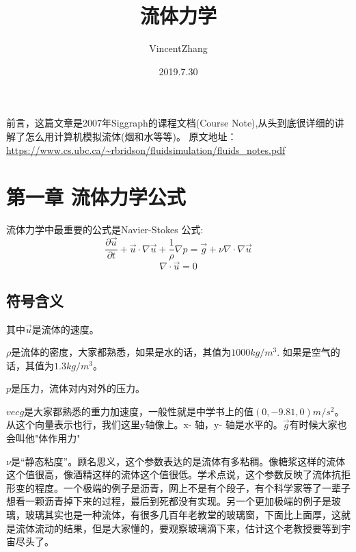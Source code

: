 \documentclass{article}
\author{VincentZhang}  %
\date{2019.7.30}  %
\title{流体力学}  %
\begin{document}
\maketitle
前言，这篇文章是2007年Siggraph的课程文档(Course Note),从头到底很详细的讲解了怎么用计算机模拟流体(烟和水等等)。
原文地址： \url{https://www.cs.ubc.ca/~rbridson/fluidsimulation/fluids_notes.pdf}

\section{第一章 流体力学公式}
流体力学中最重要的公式是Navier-Stokes 公式:
\begin{equation}
\frac{\partial{\vec{u}}}{\partial{t}}+\vec{u}\cdot \nabla{\vec{u}}+\frac{1}{\rho}\nabla{p}=\vec{g}+\nu\nabla\cdot\nabla\vec{u} \label{momentumequation}
\end{equation}
\begin{equation}
\nabla\cdot\vec{u}=0 \label{incompressibilitycondition}
\end{equation}

\subsection{符号含义}
其中$\vec{u}$是流体的速度。\par
$\rho$是流体的密度，大家都熟悉，如果是水的话，其值为$1000kg/m^3$. 如果是空气的话，其值为$1.3kg/m^3。$\par
$p$是压力，流体对内对外的压力。\par
$vec{g}$是大家都熟悉的重力加速度，一般性就是中学书上的值$(0,-9.81,0)m/s^2$。 从这个向量表示也行，我们这里y轴像上。x- 轴，y- 轴是水平的。$\vec{g}$有时候大家也会叫他"体作用力"\par
$\nu$是“静态粘度”。顾名思义，这个参数表达的是流体有多粘稠。像糖浆这样的流体这个值很高，像酒精这样的流体这个值很低。学术点说，这个参数反映了流体抗拒形变的程度。一个极端的例子是沥青，网上不是有个段子，有个科学家等了一辈子想看一颗沥青掉下来的过程，最后到死都没有实现。另一个更加极端的例子是玻璃，玻璃其实也是一种流体，有很多几百年老教堂的玻璃窗，下面比上面厚，这就是流体流动的结果，但是大家懂的，要观察玻璃滴下来，估计这个老教授要等到宇宙尽头了。
\end{document}
